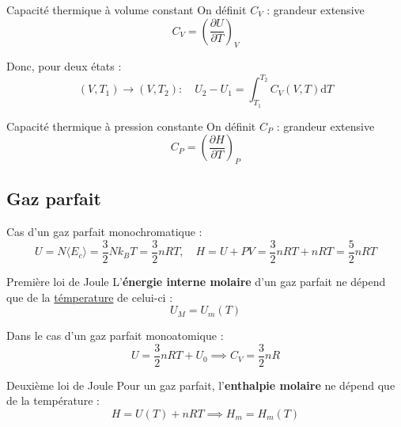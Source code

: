 \begin{Definition}[colbacktitle=red!75!black]{Capacité thermique à volume constant}{}
On définit $C_V$ : grandeur extensive
\begin{equation}
  C_V = \left( \frac{\partial U}{\partial T}  \right)_V
\end{equation}
\end{Definition}

Donc, pour deux états : 
\begin{equation}
  (V,T_1) \to (V, T_2) : \quad U_2 - U_1 = \int_{T_1}^{T_2} C_V(V,T) \mathrm{d}T
\end{equation}

\begin{Definition}[colbacktitle=red!75!black]{Capacité thermique à pression constante}{}
On définit $C_P$ : grandeur extensive 
\begin{equation}
  C_P  = \left( \frac{\partial H}{\partial T}  \right)_P
\end{equation}
\end{Definition}


\subsection{Gaz parfait} %
\label{sub:Gaz parfait}


Cas d'un gaz parfait monochromatique :
\begin{equation}
  U = N \langle E _{c} \rangle = \frac{3}{2} N k_BT = \frac{3}{2} n RT, \quad H = U + PV = \frac{3}{2} nRT + nRT = \frac{5}{2} nRT
\end{equation}
\begin{Theorem}{Première loi de Joule}{}
L'\textbf{énergie interne molaire} d'un gaz parfait ne dépend que de la \underline{témperature} de celui-ci : 
\begin{equation}
  U_M = U_m(T)
\end{equation} 
\end{Theorem}

Dans le cas d'un gaz parfait monoatomique : 
\begin{equation}
  U = \frac{3}{2} nRT + U_0 \implies C_V = \frac{3}{2} nR
\end{equation}

\begin{Theorem}{Deuxième loi de Joule}{}
Pour un gaz parfait, l'\textbf{enthalpie molaire} ne dépend que de la température : 
\begin{equation}
  H = U(T) + nRT \implies H_m = H_m(T)
\end{equation}
\end{Theorem}

